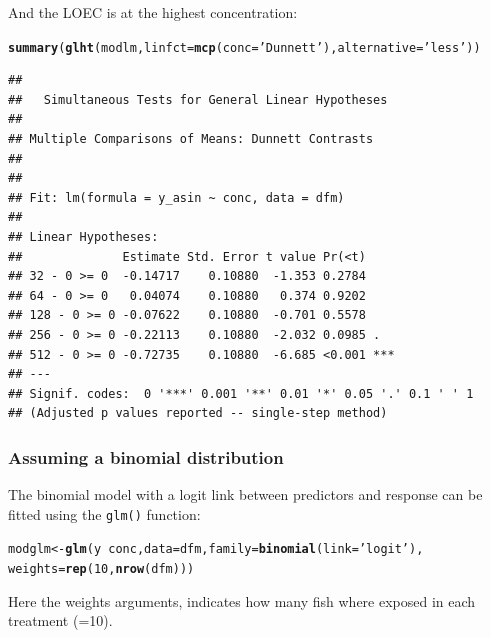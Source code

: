 \documentclass{scrartcl}\usepackage[]{graphicx}\usepackage[]{color}
\makeatletter
\newcommand{\hlnum}[1]{\textcolor[rgb]{0.686,0.059,0.569}{#1}}%
\newcommand{\hlstr}[1]{\textcolor[rgb]{0.192,0.494,0.8}{#1}}%
\newcommand{\hlopt}[1]{\textcolor[rgb]{0,0,0}{#1}}%
\newcommand{\hlstd}[1]{\textcolor[rgb]{0.345,0.345,0.345}{#1}}%
\newcommand{\hlkwb}[1]{\textcolor[rgb]{0.69,0.353,0.396}{#1}}%
\newcommand{\hlkwc}[1]{\textcolor[rgb]{0.333,0.667,0.333}{#1}}%
\newcommand{\hlkwd}[1]{\textcolor[rgb]{0.737,0.353,0.396}{\textbf{#1}}}%
\newenvironment{kframe}{%
 \def\at@end@of@kframe{}%
 \ifinner\ifhmode%
  \def\at@end@of@kframe{\end{minipage}}%
  \begin{minipage}{\columnwidth}%
 \fi\fi%
 \def\FrameCommand##1{\hskip\@totalleftmargin \hskip-\fboxsep
 \colorbox{shadecolor}{##1}\hskip-\fboxsep
     \hskip-\linewidth \hskip-\@totalleftmargin \hskip\columnwidth}%
 \MakeFramed {\advance\hsize-\width
   \@totalleftmargin\z@ \linewidth\hsize
   \@setminipage}}%
 {\par\unskip\endMakeFramed%
 \at@end@of@kframe}
\newenvironment{knitrout}{}{} %
\makeatother
\begin{document}
And the LOEC is at the highest concentration:
\begin{knitrout}
\color{fgcolor}\begin{kframe}
\begin{alltt}
\hlkwd{summary}\hlstd{(}\hlkwd{glht}\hlstd{(modlm,} \hlkwc{linfct} \hlstd{=} \hlkwd{mcp}\hlstd{(}\hlkwc{conc} \hlstd{=} \hlstr{'Dunnett'}\hlstd{),} \hlkwc{alternative} \hlstd{=} \hlstr{'less'}\hlstd{))}
\end{alltt}
\begin{verbatim}
## 
## 	 Simultaneous Tests for General Linear Hypotheses
## 
## Multiple Comparisons of Means: Dunnett Contrasts
## 
## 
## Fit: lm(formula = y_asin ~ conc, data = dfm)
## 
## Linear Hypotheses:
##              Estimate Std. Error t value Pr(<t)    
## 32 - 0 >= 0  -0.14717    0.10880  -1.353 0.2784    
## 64 - 0 >= 0   0.04074    0.10880   0.374 0.9202    
## 128 - 0 >= 0 -0.07622    0.10880  -0.701 0.5578    
## 256 - 0 >= 0 -0.22113    0.10880  -2.032 0.0985 .  
## 512 - 0 >= 0 -0.72735    0.10880  -6.685 <0.001 ***
## ---
## Signif. codes:  0 '***' 0.001 '**' 0.01 '*' 0.05 '.' 0.1 ' ' 1
## (Adjusted p values reported -- single-step method)
\end{verbatim}
\end{kframe}
\end{knitrout}


\subsubsection{Assuming a binomial distribution}
The binomial model with a logit link between predictors and response can be fitted using the \texttt{glm()} function:
\begin{knitrout}
\color{fgcolor}\begin{kframe}
\begin{alltt}
\hlstd{modglm} \hlkwb{<-} \hlkwd{glm}\hlstd{(y} \hlopt{~} \hlstd{conc ,} \hlkwc{data} \hlstd{= dfm,} \hlkwc{family} \hlstd{=} \hlkwd{binomial}\hlstd{(}\hlkwc{link} \hlstd{=} \hlstr{'logit'}\hlstd{),}
              \hlkwc{weights} \hlstd{=} \hlkwd{rep}\hlstd{(}\hlnum{10}\hlstd{,} \hlkwd{nrow}\hlstd{(dfm)))}
\end{alltt}
\end{kframe}
\end{knitrout}

Here the weights arguments, indicates how many fish where exposed in each treatment (=10).
\end{document}
